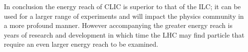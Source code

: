 In conclusion the energy reach of CLIC is superior to that of the ILC; it can be used for a larger range of experiments and will impact the physics community in a more profound manner. However accompanying the greater energy reach is years of research and development in which time the LHC may find particle that require an even larger energy reach to be examined.
